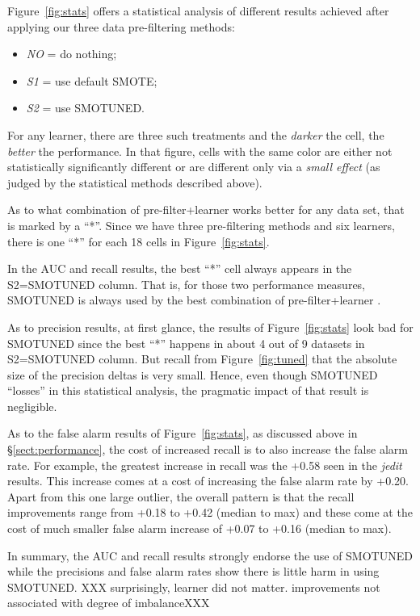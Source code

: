 \documentclass[10pt,conference]{IEEEtran}
\newcommand{\bi}{\begin{itemize}[leftmargin=0.4cm]}
\newcommand{\ei}{\end{itemize}}
\theoremstyle{break}
\theoremstyle{break}
\newcommand{\tion}[1]{{\S}\ref{sect:#1}}
\begin{document}
Figure~\ref{fig:stats} offers a statistical analysis
of different results achieved
after applying our three data pre-filtering methods:
\bi
\item  {\em NO} = do nothing;
\item {\em S1} = use default SMOTE;
\item {\em S2} = use SMOTUNED.
\ei
For any learner, there are three such treatments and the {\em darker} the cell, the {\em better} the performance. 
In that figure, cells with the same color are
either not statistically significantly different or
are different only via a {\em small effect}
(as judged by the statistical methods described above).

As to what combination of pre-filter+learner works better for any data set, that is marked by a ``*''. Since we have three pre-filtering methods and six learners, there is one   ``*'' for each 18 cells in Figure~\ref{fig:stats}.

In the  AUC and recall results,  the best ``*'' cell always appears in the S2=SMOTUNED column. 
That is, for those two performance measures,  SMOTUNED is always
used by the best combination of pre-filter+learner .

As to precision  results,  at first glance, the  results of Figure~\ref{fig:stats} look bad for SMOTUNED since
the best ``*''  happens in about 4 out of 9 datasets in S2=SMOTUNED column.
 But recall from Figure~\ref{fig:tuned} that the absolute size of the precision   deltas is very small.  Hence, even though SMOTUNED ``losses'' in this statistical analysis, the pragmatic impact of that result  is  negligible.
 
As to the false alarm results of Figure~\ref{fig:stats}, as discussed above in \tion{performance}, the cost of increased recall is to also increase
the false alarm rate. For example, the greatest increase in recall was the +0.58 seen in the {\em jedit} results. This increase comes at a cost
of increasing the false alarm rate by +0.20. Apart from this one large outlier, the overall pattern is that the recall improvements range from +0.18 to +0.42 (median to max)
and these come at the cost of much smaller false alarm increase of +0.07 to +0.16 (median to max). 
 
In summary, the AUC and recall results strongly endorse the  use of SMOTUNED
while the precisions and false alarm rates
show there is little harm in using SMOTUNED. 
XXX surprisingly, learner did not matter. improvements not associated
with degree of imbalanceXXX
\end{document}
